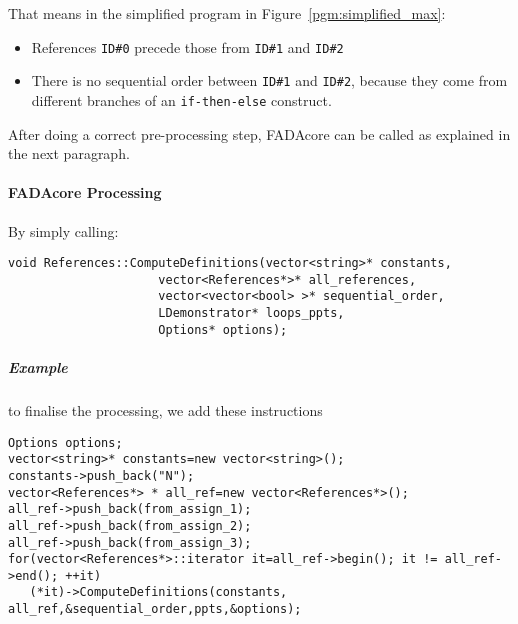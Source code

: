 That means in the simplified program in Figure~\ref{pgm:simplified_max}:
\begin{itemize}
 \item References \verb|ID#0| precede those from \verb|ID#1| and \verb|ID#2|
 \item There is no sequential order between \verb|ID#1| and \verb|ID#2|, because they come from different branches of an \verb|if-then-else| construct.
\end{itemize}

After doing a correct pre-processing step, FADAcore can be called as explained in the next paragraph.
\paragraph{FADAcore Processing}
By simply calling:
\begin{footnotesize}
\begin{lstlisting}[frame=single,framerule=0pt]
void References::ComputeDefinitions(vector<string>* constants,
                     vector<References*>* all_references,
                     vector<vector<bool> >* sequential_order,
                     LDemonstrator* loops_ppts,
                     Options* options);
\end{lstlisting}
\end{footnotesize}

\subparagraph{Example} to finalise the processing, we add these instructions 
\begin{footnotesize}
\begin{lstlisting}[frame=single,framerule=0pt]
Options options;
vector<string>* constants=new vector<string>();
constants->push_back("N");
vector<References*> * all_ref=new vector<References*>();
all_ref->push_back(from_assign_1);
all_ref->push_back(from_assign_2);
all_ref->push_back(from_assign_3);
for(vector<References*>::iterator it=all_ref->begin(); it != all_ref->end(); ++it)
   (*it)->ComputeDefinitions(constants, all_ref,&sequential_order,ppts,&options);
\end{lstlisting}
\end{footnotesize}

